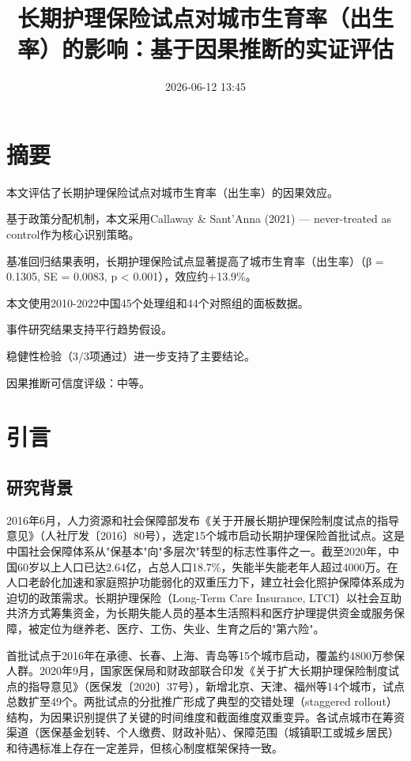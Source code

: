 \documentclass[11pt,a4paper]{article}
\title{长期护理保险试点对城市生育率（出生率）的影响：基于因果推断的实证评估}
\author{}
\date{2026-06-12 13:45}
\begin{document}
\maketitle

\section{摘要}
本文评估了长期护理保险试点对城市生育率（出生率）的因果效应。

基于政策分配机制，本文采用Callaway \& Sant'Anna (2021) — never-treated as control作为核心识别策略。

基准回归结果表明，长期护理保险试点显著提高了城市生育率（出生率）（β = 0.1305, SE = 0.0083, p < 0.001），效应约+13.9\%。

本文使用2010-2022中国45个处理组和44个对照组的面板数据。

事件研究结果支持平行趋势假设。

稳健性检验（3/3项通过）进一步支持了主要结论。

因果推断可信度评级：中等。

\section{引言}
\subsection{研究背景}

2016年6月，人力资源和社会保障部发布《关于开展长期护理保险制度试点的指导意见》（人社厅发〔2016〕80号），选定15个城市启动长期护理保险首批试点。这是中国社会保障体系从"保基本"向"多层次"转型的标志性事件之一。截至2020年，中国60岁以上人口已达2.64亿，占总人口18.7\%，失能半失能老年人超过4000万。在人口老龄化加速和家庭照护功能弱化的双重压力下，建立社会化照护保障体系成为迫切的政策需求。长期护理保险（Long-Term Care Insurance, LTCI）以社会互助共济方式筹集资金，为长期失能人员的基本生活照料和医疗护理提供资金或服务保障，被定位为继养老、医疗、工伤、失业、生育之后的"第六险"。

首批试点于2016年在承德、长春、上海、青岛等15个城市启动，覆盖约4800万参保人群。2020年9月，国家医保局和财政部联合印发《关于扩大长期护理保险制度试点的指导意见》（医保发〔2020〕37号），新增北京、天津、福州等14个城市，试点总数扩至49个。两批试点的分批推广形成了典型的交错处理（staggered rollout）结构，为因果识别提供了关键的时间维度和截面维度双重变异。各试点城市在筹资渠道（医保基金划转、个人缴费、财政补贴）、保障范围（城镇职工或城乡居民）和待遇标准上存在一定差异，但核心制度框架保持一致。
\end{document}
